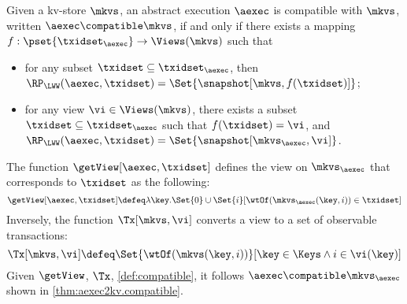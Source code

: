 \begin{definition}
\label{def:compatible}
Given a kv-store $\mkvs$,
an abstract execution $\aexec$ is compatible with $\mkvs$, written 
$\aexec \compatible \mkvs$, if and only if there exists a  mapping 
$f: \pset{\txidset_{\aexec}} \rightarrow \Views(\mkvs)$
such that  
\begin{itemize}
\item for any subset $\txidset \subseteq \txidset_{\aexec}$, then $\RP_{\LWW}(\aexec, \txidset) = \Set{\snapshot[\mkvs, f(\txidset)]}$; 
\item for any view $\vi \in \Views(\mkvs)$, there exists a subset $\txidset \subseteq \txidset_{\aexec}$ 
such that $f(\txidset) = \vi$, and $\RP_{\LWW}(\aexec, \txidset) = \Set{\snapshot[\mkvs_{\aexec}, \vi]}$.
\end{itemize}
\end{definition}

The function $\getView[\aexec, \txidset]$ defines the view on \( \mkvs_\aexec \) that corresponds to \( \txidset \) as the following:
\[
    \getView[\aexec, \txidset] \defeq \lambda \key. \Set{0} \cup \Set{i}[\wtOf(\mkvs_{\aexec}(\key, i)) \in \txidset]
\]
Inversely, the function \( \Tx[\mkvs, \vi] \) converts a view to a set of observable transactions:
\[
    \Tx[\mkvs, \vi] \defeq \Set{\wtOf(\mkvs(\key, i))}[\key \in \Keys \land i \in \vi(\key)]
\]
Given \( \getView \), \( \Tx \), \cref{def:compatible}, 
it follows \( \aexec \compatible \mkvs_{\aexec} \) shown in \cref{thm:aexec2kv.compatible}.


